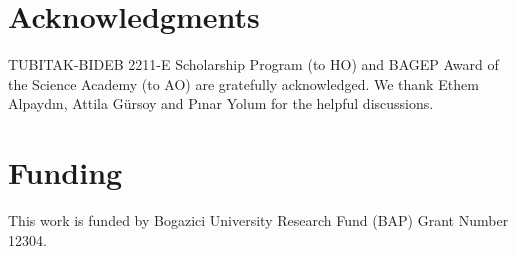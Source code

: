 \documentclass[11pt,letterpaper]{article}
\begin{document}
\section*{Acknowledgments}
TUBITAK-BIDEB 2211-E Scholarship Program (to HO) and BAGEP Award of the Science Academy (to AO) are gratefully acknowledged.  We thank Ethem Alpaydın, Attila Gürsoy and Pınar Yolum for the helpful discussions.\vspace*{-12pt}

\section*{Funding}

This work is funded by Bogazici University Research Fund (BAP) Grant Number 12304.

\nolinenumbers




\end{document}
